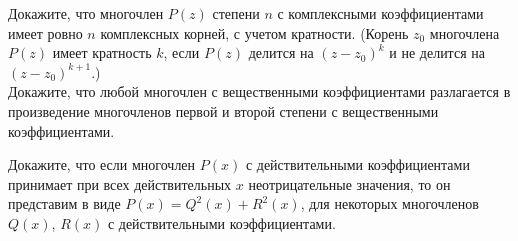\begin{problems}
\item
\sbp
Докажите, что многочлен $P(z)$ степени $n$ с комплексными коэффициентами имеет
ровно $n$ комплексных корней, с учетом кратности.
(Корень $z_0$ многочлена $P(z)$ имеет кратность $k$, если $P(z)$ делится на
$(z - z_0)^k$ и не делится на $(z - z_0)^{k+1}$.)
\\
\sbp
Докажите, что любой многочлен с вещественными коэффициентами разлагается в
произведение многочленов первой и второй степени с вещественными
коэффициентами.

\item
Докажите, что если многочлен $P(x)$ с действительными коэффициентами принимает
при всех действительных $x$ неотрицательные значения, то он представим в виде
$P(x) = Q^2(x) + R^2(x)$, для некоторых многочленов $Q(x)$, $R(x)$ с
действительными коэффициентами.

\end{problems}

